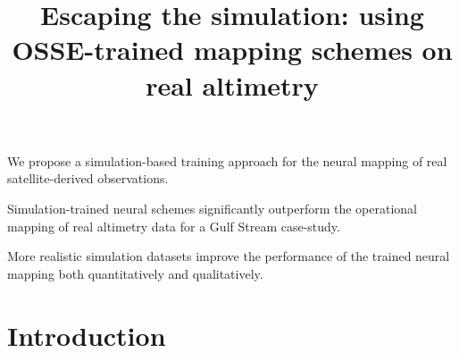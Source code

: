\documentclass[draft]{agujournal2019}
\begin{document}
%
%


\title{Escaping the simulation: using OSSE-trained mapping schemes on real altimetry}

\begin{keypoints}
\item We propose a simulation-based training approach for the neural mapping of real satellite-derived observations.
\item Simulation-trained neural schemes significantly outperform the operational mapping of real altimetry data for a Gulf Stream case-study.
\item More realistic simulation datasets improve the performance of the trained neural mapping both quantitatively and qualitatively. 
\end{keypoints}



\section{Introduction}






\end{document}
